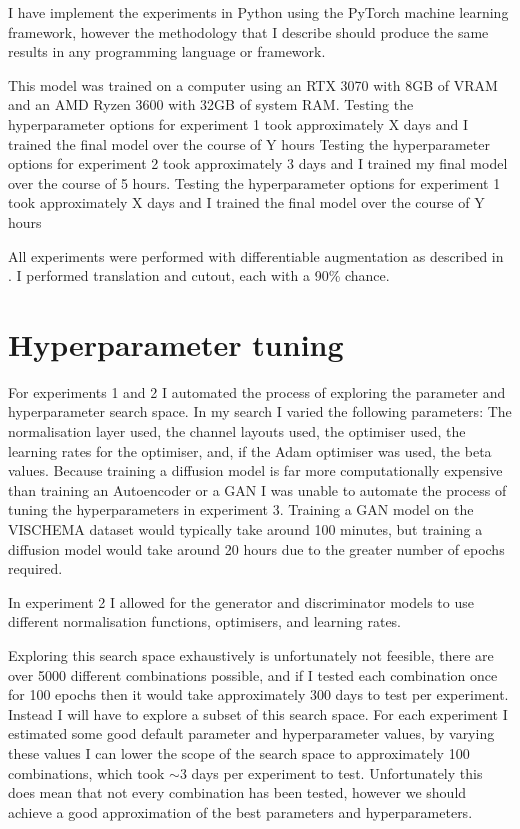 \documentclass{UoYCSproject}
\begin{document}
I have implement the experiments in Python using the PyTorch machine learning framework, however the methodology that I describe should produce the same results in any programming language or framework.

This model was trained on a computer using an RTX 3070 with 8GB of VRAM and an AMD Ryzen 3600 with 32GB of system RAM.
Testing the hyperparameter options for experiment 1 took approximately X days and I trained the final model over the course of Y hours
Testing the hyperparameter options for experiment 2 took approximately 3 days and I trained my final model over the course of 5 hours.
Testing the hyperparameter options for experiment 1 took approximately X days and I trained the final model over the course of Y hours

All experiments were performed with differentiable augmentation as described in \cite{zhao2020differentiable}. I performed translation and cutout, each with a 90\% chance.

\section{Hyperparameter tuning}

For experiments 1 and 2 I automated the process of exploring the parameter and hyperparameter search space. In my search I varied the following parameters: The normalisation layer used, the channel layouts used, the optimiser used, the learning rates for the optimiser, and, if the Adam optimiser was used, the beta values. Because training a diffusion model is far more computationally expensive than training an Autoencoder or a GAN I was unable to automate the process of tuning the hyperparameters in experiment 3. Training a GAN model on the VISCHEMA dataset would typically take around 100 minutes, but training a diffusion model would take around 20 hours due to the greater number of epochs required.


In experiment 2 I allowed for the generator and discriminator models to use different normalisation functions, optimisers, and learning rates. 


Exploring this search space exhaustively is unfortunately not feesible, there are over 5000 different combinations possible, and if I tested each combination once for 100 epochs then it would take approximately 300 days to test per experiment.
Instead I will have to explore a subset of this search space. For each experiment I estimated some good default parameter and hyperparameter values, by varying these values I can lower the scope of the search space to 
approximately 100 combinations, which took \(\sim\)3 days per experiment to test. Unfortunately this does mean that not every combination has been tested, however we should achieve a good approximation of the best parameters and hyperparameters.
\end{document}
